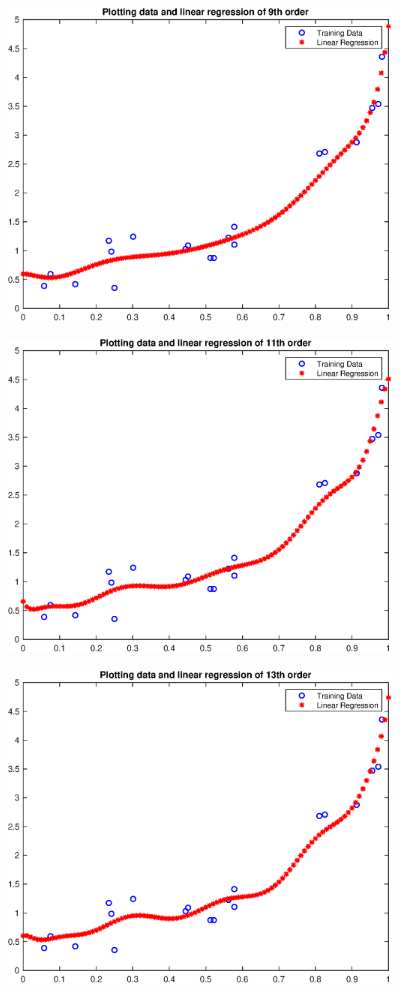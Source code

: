 \documentclass{article}
\begin{document}
\includegraphics [width=4in]{practice1_06.eps}

\includegraphics [width=4in]{practice1_07.eps}

\includegraphics [width=4in]{practice1_08.eps}
\end{document}
